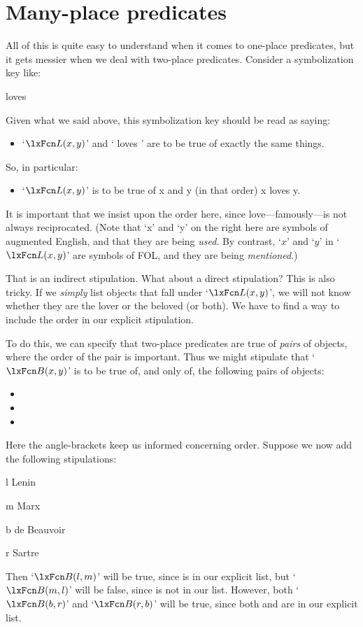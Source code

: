 \section{Many-place predicates}
All of this is quite easy to understand when it comes to one-place predicates, but it gets messier when we deal with two-place predicates. Consider a symbolization key like:
	\begin{ekey}
		\item[\atom{L}{x,y}]  loves 
	\end{ekey}
Given what we said above, this symbolization key should be read as saying:
	\begin{itemize}
		\item `$\atom{L}{x,y}$' and ` loves ' are to be true of exactly the same things.
	\end{itemize}
So, in particular:
	\begin{itemize}
		\item `$\atom{L}{x,y}$' is to be true of x and y (in that order) \ifeff{} x loves y.
	\end{itemize}
It is important that we insist upon the order here, since love---famously---is not always reciprocated. (Note that `x' and `y' on the right here are symbols of augmented English, and that they are being \emph{used}. By contrast, `$x$' and `$y$' in `$\atom{L}{x,y}$' are symbols of FOL, and they are being \emph{mentioned}.)

That is an indirect stipulation. What about a direct stipulation? This is also tricky. If we \emph{simply} list objects that fall under `$\atom{L}{x,y}$', we will not know whether they are the lover or the beloved (or both). We have to find a way to include the order in our explicit stipulation.

To do this, we can specify that two-place predicates are true of \emph{pairs} of objects, where the order of the pair is important. Thus we might stipulate that `$\atom{B}{x,y}$' is to be true of, and only of, the following pairs of objects:
	\begin{itemize}
		\item \ntuple{Lenin, Marx}
		\item \ntuple{de Beauvoir, Sartre}
		\item \ntuple{Sartre, de Beauvoir}
	\end{itemize}
Here the angle-brackets keep us informed concerning order. Suppose we now add the following stipulations:
	\begin{ekey}
		\item[l] Lenin
		\item[m] Marx
		\item[b] de Beauvoir
		\item[r] Sartre
	\end{ekey}
Then `$\atom{B}{l,m}$' will be true, since  is in our explicit list, but `$\atom{B}{m,l}$' will be false, since  is not in our list. However, both `$\atom{B}{b,r}$' and `$\atom{B}{r,b}$' will be true, since both  and  are in our explicit list.

